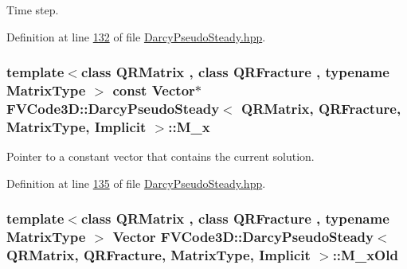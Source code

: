 Time step. 



Definition at line \hyperlink{DarcyPseudoSteady_8hpp_source_l00132}{132} of file \hyperlink{DarcyPseudoSteady_8hpp_source}{Darcy\+Pseudo\+Steady.\+hpp}.

\subsubsection[{\texorpdfstring{M\+\_\+x}{M_x}}]{\setlength{\rightskip}{0pt plus 5cm}template$<$class Q\+R\+Matrix , class Q\+R\+Fracture , typename Matrix\+Type $>$ const {\bf Vector}$\ast$ {\bf F\+V\+Code3\+D\+::\+Darcy\+Pseudo\+Steady}$<$ Q\+R\+Matrix, Q\+R\+Fracture, Matrix\+Type, {\bf Implicit} $>$\+::M\+\_\+x\hspace{0.3cm}{\ttfamily [protected]}}\hypertarget{classFVCode3D_1_1DarcyPseudoSteady_3_01QRMatrix_00_01QRFracture_00_01MatrixType_00_01Implicit_01_4_ac07a22b0b6f07aec3909b10924602ffc}{}\label{classFVCode3D_1_1DarcyPseudoSteady_3_01QRMatrix_00_01QRFracture_00_01MatrixType_00_01Implicit_01_4_ac07a22b0b6f07aec3909b10924602ffc}


Pointer to a constant vector that contains the current solution. 



Definition at line \hyperlink{DarcyPseudoSteady_8hpp_source_l00135}{135} of file \hyperlink{DarcyPseudoSteady_8hpp_source}{Darcy\+Pseudo\+Steady.\+hpp}.

\subsubsection[{\texorpdfstring{M\+\_\+x\+Old}{M_xOld}}]{\setlength{\rightskip}{0pt plus 5cm}template$<$class Q\+R\+Matrix , class Q\+R\+Fracture , typename Matrix\+Type $>$ {\bf Vector} {\bf F\+V\+Code3\+D\+::\+Darcy\+Pseudo\+Steady}$<$ Q\+R\+Matrix, Q\+R\+Fracture, Matrix\+Type, {\bf Implicit} $>$\+::M\+\_\+x\+Old\hspace{0.3cm}{\ttfamily [protected]}}\hypertarget{classFVCode3D_1_1DarcyPseudoSteady_3_01QRMatrix_00_01QRFracture_00_01MatrixType_00_01Implicit_01_4_a09160731863ac36c2d6e6650a81a12e2}{}\label{classFVCode3D_1_1DarcyPseudoSteady_3_01QRMatrix_00_01QRFracture_00_01MatrixType_00_01Implicit_01_4_a09160731863ac36c2d6e6650a81a12e2}


